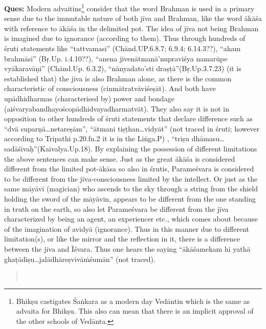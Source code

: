 \textbf{Ques:} Modern advaitins\footnote{Bhikṣu castigates Śaṅkara as a modern day Vedāntin which is the same as advaita for Bhikṣu. This also can mean that there is an implicit approval of the other schools of Vedānta.} consider that the word Brahman is used in a primary sense due to the immutable nature of both jīva and Brahman, like the word ākāśa with reference to ākāśa in the delimited pot. The idea of jīva not being Brahman is imagined due to ignorance (according to them). Thus through hundreds of śruti statements like “tattvamasi” (Chānd.UP.6.8.7; 6.9.4; 6.14.3??), “aham brahmāsi” (Bṛ.Up. i.4.10??), “anena jīvenātmanā’nupraviśya namarūpe vyākaravāṇi” (Chānd.Up. 6.3.2), “nānyadato’sti draṣṭā”(Bṛ.Up.3.7.23) (it is established that) the jīva is also Brahman alone, as there is the common characteristic of consciousness (cinmātratvāviśeṣāt). And both have upādhidharmas (characterised by) power and bondage (aiśvaryabandhayoścopādhidvayadharmatvāt). They also say it is not in opposition to other hundreds of śruti statements that declare difference such as “dvā suparṇā\-…netareṣām”, “ātmani tiṣṭhan…vidyāt” (not traced in śruti; however according to Tripathi p.20.fn.2 it is in the Liṅga.P) , “triṣu dhāmasu…\-sadāśivaḥ”(Kaivalya.Up.18). By explaining the possession of different limitations the above sentences can make sense. Just as the great ākāśa is considered different from the limited pot-ākāsa so also in śrutis, Parameśvara is considered to be different from the jīva-consciousness limited by the intellect. Or just as the same māyāvī (magician) who ascends to the sky through a string from the shield holding the sword of the māyāvin, appears to be different from the one standing in truth on the earth, so also let Parameśvara be different from the jīva characterized by being an agent, an experiencer etc., which comes about because of the imagination of avidyā (ignorance). Thus in this manner due to   different limitation(s), or like the mirror and the reflection in it, there is a difference between the jīva and Īśvara. Thus one hears the saying “ākāśamekam hi yathā ghaṭādiṣu…jalādhāreṣvivāṁśumān” (not traced). 


\begin{verse}
\\
\end{verse}

